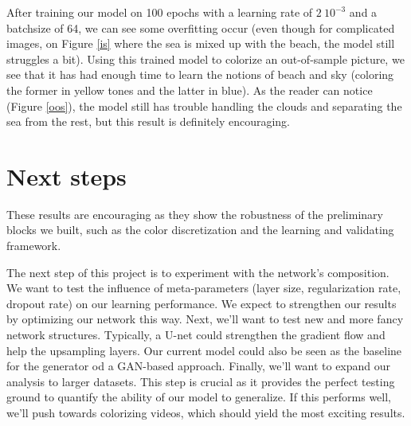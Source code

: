 \documentclass[10pt,twocolumn,letterpaper]{article}
\begin{document}
After training our model on 100 epochs with a learning rate of $2~10^{-3}$ and a batchsize of 64, we can see some overfitting occur (even though for complicated images, \eg on Figure \ref{is} where the sea is mixed up with the beach, the model still struggles a bit).
Using this trained model to colorize an out-of-sample picture, we see that it has had enough time to learn the notions of beach and sky (coloring the former in yellow tones and the latter in blue). As the reader can notice (Figure \ref{oos}), the model still has trouble handling the clouds and separating the sea from the rest, but this result is definitely encouraging.

\section{Next steps}

%											 

These results are encouraging as they show the robustness of the preliminary blocks we built, such as the color discretization and the learning and validating framework.

The next step of this project is to experiment with the network's composition. We want to test the influence of meta-parameters (layer size, regularization rate, dropout rate) on our learning performance. We expect to strengthen our results by optimizing our network this way. Next, we'll want to test new and more fancy network structures. Typically, a U-net could strengthen the gradient flow and help the upsampling layers. Our current model could also be seen as the baseline for the generator od a GAN-based approach.
Finally, we'll want to expand our analysis to larger datasets. This step is crucial as it provides the perfect testing ground to quantify the ability of our model to generalize. If this performs well, we'll push towards colorizing videos, which should yield the most exciting results.

{\small


}
\end{document}
